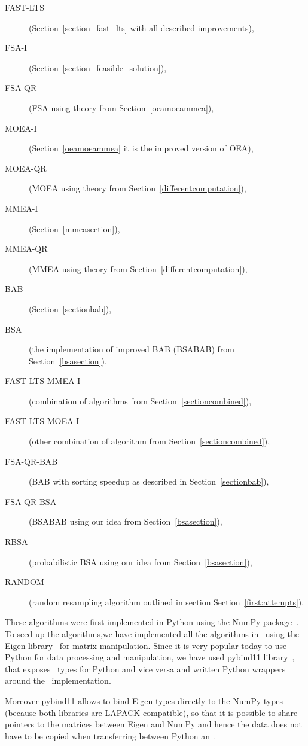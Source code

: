 \begin{description}
    \item[FAST-LTS] (Section~\ref{section_fast_lts} with all described improvements),
    \item[FSA-I] (Section~\ref{section_feasible_solution}),
    \item[FSA-QR] (FSA using theory from Section~\ref{oeamoeammea}),
    \item[MOEA-I] (Section~\ref{oeamoeammea} it is the improved version of OEA),
    \item[MOEA-QR] (MOEA using theory from Section~\ref{differentcomputation}),
    \item[MMEA-I] (Section~\ref{mmeasection}),
    \item[MMEA-QR] (MMEA using theory from Section~\ref{differentcomputation}),
    \item[BAB] (Section~\ref{sectionbab}),
    \item[BSA] (the implementation of improved BAB (BSABAB) from Section~\ref{bsasection}),
    \item[FAST-LTS-MMEA-I] (combination of algorithms from Section~\ref{sectioncombined}),
    \item[FAST-LTS-MOEA-I] (other combination of algorithm from Section~\ref{sectioncombined}),
    \item[FSA-QR-BAB] (BAB with sorting speedup as described in Section~\ref{sectionbab}),
    \item[FSA-QR-BSA] (BSABAB using our idea from Section~\ref{bsasection}),
    \item[RBSA] (probabilistic BSA using our idea from Section~\ref{bsasection}),
    \item[RANDOM] (random resampling algorithm outlined in section Section~\ref{first:attempts}).
\end{description}

These algorithms were first implemented in Python using the NumPy package~\cite{numpy}. To seed up the algorithms,we have implemented all the algorithms in \CC \ using the Eigen library~\cite{eigenweb} for matrix manipulation. Since it is very popular today to use Python for data processing and manipulation, we have used pybind11 library~\cite{pybind11}, that exposes \CC \ types for Python and vice versa and written Python wrappers around the \CC \ implementation. 

Moreover pybind11 allows to bind Eigen types directly to the NumPy types (because both libraries are LAPACK compatible), so that it is possible to share pointers to the matrices between Eigen and NumPy and hence the data does not have to be copied when transferring between Python an \CC.

